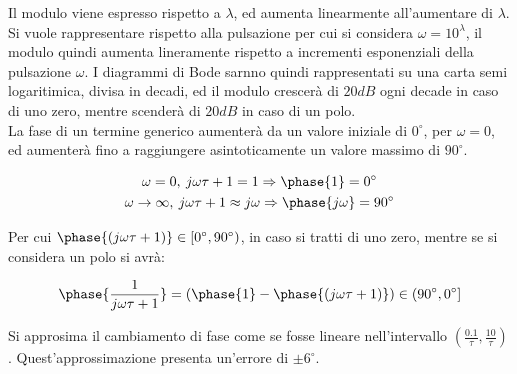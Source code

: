\documentclass{article}
\numberwithin{equation}{subsection}
\begin{document}
\begin{center}
\end{center}

Il modulo viene espresso rispetto a $\lambda$, ed aumenta linearmente all'aumentare di $\lambda$. Si vuole rappresentare rispetto alla pulsazione per cui si considera 
$\omega=10^{\lambda}$, il modulo quindi aumenta lineramente rispetto a incrementi esponenziali della pulsazione $\omega$. I diagrammi di Bode sarnno quindi rappresentati 
su una carta semi logaritimica, divisa in decadi, ed il modulo crescerà di $20dB$ ogni decade in caso di uno zero, mentre scenderà di $20dB$ in caso di un polo. \\

La fase di un termine generico aumenterà da un valore iniziale di $0^{\circ}$, per $\omega=0$, ed aumenterà fino a raggiungere asintoticamente un valore massimo di 
$90^{\circ}$. 

\begin{gather}
    \omega=0,\: j\omega\tau+1=1\Rightarrow\phase{1}=0^{\circ}\\
    \omega\to\infty,\:j\omega\tau+1\approx j\omega\Rightarrow\phase{j\omega}=90^{\circ}
\end{gather}

Per cui $\phase{(j\omega\tau+1)}\in[0^{\circ},90^{\circ})$, in caso si tratti di uno zero, mentre se si considera un polo si avrà: 

\begin{equation}
    \phase{\displaystyle\frac{1}{j\omega\tau+1}}=\left(\phase{1}-\phase{(j\omega\tau+1)}\right)\in(90^{\circ},0^{\circ}]
\end{equation}

Si approsima il cambiamento di fase come se fosse lineare nell'intervallo $\left(\displaystyle\frac{0.1}{\tau},\frac{10}{\tau}\right)$. 
Quest'approssimazione presenta un'errore di $\pm6^{\circ}$. 
\end{document}

